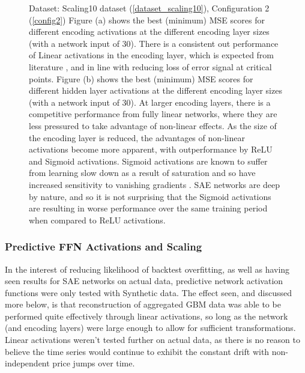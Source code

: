 \documentclass[a4paper,11pt,oneside]{article}
\theoremstyle{plain}
\theoremstyle{definition}
\begin{document}
\begin{figure}[H]
		\caption[MSE by Activations and Encoding Layer Size]
		{Dataset: Scaling10 dataset (\ref{dataset_scaling10}), Configuration 2 (\ref{config2})
			\newline Figure (a) shows the best (minimum) MSE scores for different encoding activations at the different encoding layer sizes (with a network input of 30). There is a consistent out performance of Linear activations in the encoding layer, which is expected from literature \cite{Hinton2}, and in line with reducing loss of error signal at critical points. 
			\newline Figure (b) shows the best (minimum) MSE scores for different hidden layer activations at the different encoding layer sizes (with a network input of 30). At larger encoding layers, there is a competitive performance from fully linear networks, where they are less pressured to take advantage of non-linear effects. As the size of the encoding layer is reduced, the advantages of non-linear activations become more apparent, with outperformance by ReLU and Sigmoid activations. Sigmoid activations are known to suffer from learning slow down as a result of saturation and so have increased sensitivity to vanishing gradients \cite{Glorot2}. SAE networks are deep by nature, and so it is not surprising that the Sigmoid activations are resulting in worse performance over the same training period when compared to ReLU activations. \newline}
		\label{figure-mse_encoding_activations}
	\end{figure}
	
	
	\subsubsection{Predictive FFN Activations and Scaling}
	
	In the interest of reducing likelihood of backtest overfitting, as well as having seen results for SAE networks on actual data, predictive network activation functions were only tested with Synthetic data.	The effect seen, and discussed more below, is that reconstruction of aggregated GBM data was able to be performed quite effectively through linear activations, so long as the network (and encoding layers) were large enough to allow for sufficient transformations. Linear activations weren't tested further on actual data, as there is no reason to believe the time series would continue to exhibit the constant drift with non-independent price jumps over time. 
	
\end{document}
